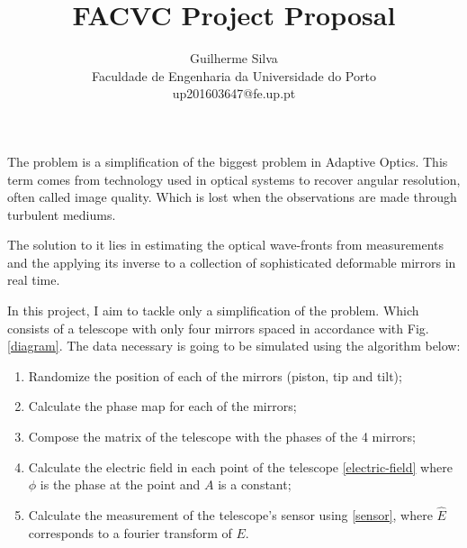 \documentclass{article}
\title{FACVC Project Proposal}
\author{Guilherme Silva\\
Faculdade de Engenharia da Universidade do Porto \\
up201603647@fe.up.pt}
\date{}
\begin{document}
\maketitle

The problem is a simplification of the biggest problem in Adaptive Optics.
This term comes from technology used in optical systems to recover angular
resolution, often called image quality. Which is lost when the observations
are made through turbulent mediums.

The solution to it lies in estimating the optical wave-fronts from measurements
and the applying its inverse to a collection of sophisticated deformable
mirrors in real time.

In this project, I aim to tackle only a simplification of the problem. Which
consists of a telescope with only four mirrors spaced in accordance with Fig.
\ref{diagram}. The data necessary is going to be simulated using the algorithm 
below:


\begin{enumerate}
    \item Randomize the position of each of the mirrors (piston, tip and tilt);
    \item Calculate the phase map for each of the mirrors;
    \item Compose the matrix of the telescope with the phases of the 4 mirrors;
    \item Calculate the electric field in each point of the telescope
          \ref{electric-field} where $\phi$ is the phase at the point and 
          $A$ is a constant;
    \item Calculate the measurement of the telescope's sensor using \ref{sensor},
          where $\hat{E}$ corresponds to a fourier transform of $E$.
\end{enumerate}
\end{document}
